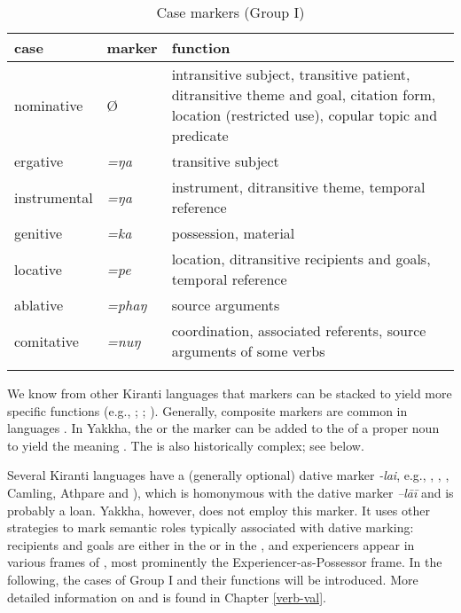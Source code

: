 \begin{table}
\begin{tabular}{llp{7cm}}
\lsptoprule
{\sc case}&{\sc marker}&{\sc function}\\
\midrule
nominative& Ø&intransitive subject, transitive patient, ditransitive theme and goal, citation form, location (restricted use), copular topic and predicate\\
ergative&\emph{=ŋa}&transitive subject\\
instrumental&\emph{=ŋa}&instrument, ditransitive theme, temporal reference\\
genitive&\emph{=ka} &possession, material\\
locative&\emph{=pe} &location, ditransitive recipients and  goals, temporal reference\\
ablative&\emph{=phaŋ} &source arguments\\
comitative&\emph{=nuŋ} &coordination, associated referents, source arguments of some verbs\\
\lspbottomrule
\end{tabular}
\caption{Case markers (Group I)}\label{case-markers}
\end{table}


We know from other Kiranti languages that  markers can be stacked to yield more specific functions (e.g., \citealt[81]{Ebert1994The-structure}; \citealt[6]{Dirksmeyer2008Spatial}; \citealt[26]{Schikowski2013_Thesis}). Generally, composite  markers are common in  languages \citep[60]{DeLancey1985_Etymological}. In Yakkha, the  or the   marker can be added to the  of a proper noun to yield the meaning . The  is also historically complex; see  below.

Several Kiranti languages have a (generally optional) dative marker \emph{-lai}, e.g., , \citep{Doornenbal2009A-grammar},  \citep{Bickeletal2007Two-ways}, Camling, Athpare and  \citep{Ebert1994The-structure}), which is homonymous with the  dative marker \emph{–lāī} and is probably a loan. Yakkha, however, does not employ this marker. It uses other strategies to mark semantic roles typically associated with  dative marking: recipients and goals are either in the  or in the , and experiencers appear in various frames of , most prominently the Experiencer-as-Possessor frame.
In the following, the cases of Group I and their functions will be introduced. More detailed information on  and  is found in Chapter \ref{verb-val}.

